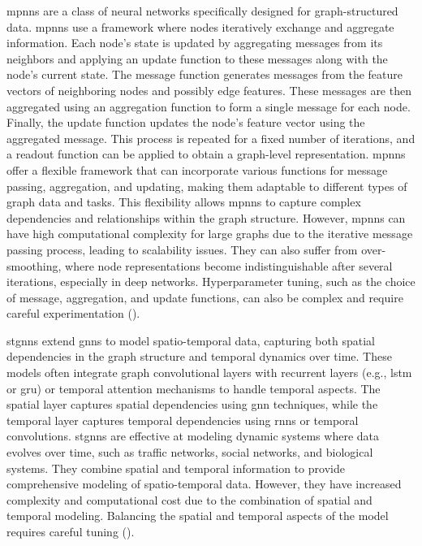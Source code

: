 \glspl{mpnn} are a class of neural networks specifically designed for graph-structured data.
\glspl{mpnn} use a framework where nodes iteratively exchange and aggregate information.
Each node's state is updated by aggregating messages from its neighbors and applying an update function to these messages along with the node's current state.
The message function generates messages from the feature vectors of neighboring nodes and possibly edge features.
These messages are then aggregated using an aggregation function to form a single message for each node.
Finally, the update function updates the node's feature vector using the aggregated message.
This process is repeated for a fixed number of iterations, and a readout function can be applied to obtain a graph-level representation.
\glspl{mpnn} offer a flexible framework that can incorporate various functions for message passing, aggregation, and updating, making them adaptable to different types of graph data and tasks.
This flexibility allows \glspl{mpnn} to capture complex dependencies and relationships within the graph structure.
However, \glspl{mpnn} can have high computational complexity for large graphs due to the iterative message passing process, leading to scalability issues.
They can also suffer from over-smoothing, where node representations become indistinguishable after several iterations, especially in deep networks.
Hyperparameter tuning, such as the choice of message, aggregation, and update functions, can also be complex and require careful experimentation (\cite{Gilmer2017}).

\glspl{stgnn} extend \glspl{gnn} to model spatio-temporal data, capturing both spatial dependencies in the graph structure and temporal dynamics over time.
These models often integrate graph convolutional layers with recurrent layers (e.g., \gls{lstm} or \gls{gru}) or temporal attention mechanisms to handle temporal aspects.
The spatial layer captures spatial dependencies using \gls{gnn} techniques, while the temporal layer captures temporal dependencies using \glspl{rnn} or temporal convolutions.
\glspl{stgnn} are effective at modeling dynamic systems where data evolves over time, such as traffic networks, social networks, and biological systems.
They combine spatial and temporal information to provide comprehensive modeling of spatio-temporal data.
However, they have increased complexity and computational cost due to the combination of spatial and temporal modeling.
Balancing the spatial and temporal aspects of the model requires careful tuning (\cite{Yu2018,Li2018}).

